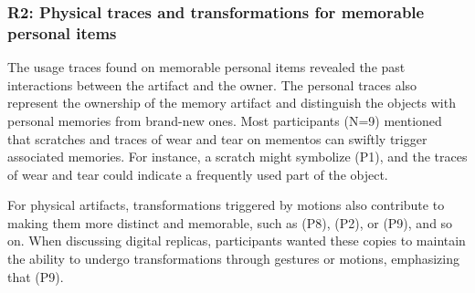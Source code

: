 \subsubsection{R2: Physical traces and transformations for memorable personal items}
The usage traces found on memorable personal items revealed the past interactions between the artifact and the owner. 
The personal traces also represent the ownership of the memory artifact and distinguish the objects with personal memories from brand-new ones. 
Most participants (N=9) mentioned that scratches and traces of wear and tear on mementos can swiftly trigger associated memories. 
For instance, a scratch might symbolize  (P1), and the traces of wear and tear could indicate a frequently used part of the object. 

For physical artifacts, transformations triggered by motions also contribute to making them more distinct and memorable, such as  (P8),  (P2), or  (P9), and so on.
When discussing digital replicas, participants wanted these copies to maintain the ability to undergo transformations through gestures or motions, emphasizing that  (P9). 






